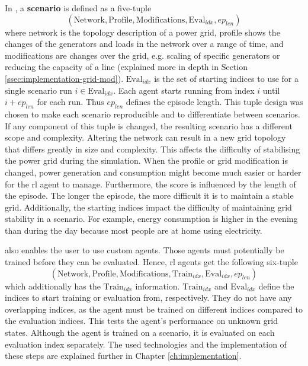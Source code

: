 In \benchmark, a \textbf{scenario} is defined as a five-tuple 
\[(\text{Network}, \text{Profile}, \text{Modifications}, \text{Eval}_{idx}, ep_{len})\]
where network is the topology description of a power grid, profile shows the changes of the generators and loads in the network over a range of time, and modifications are changes over the grid, e.g. scaling of specific generators or reducing the capacity of a line (explained more in depth in Section \ref{ssec:implementation-grid-mod}). $\text{Eval}_{idx}$ is the set of starting indices to use for a single scenario run $i\in\text{Eval}_{idx}$. Each agent starts running from index $i$ until $i + ep_{len}$ for each run. Thus $ep_{len}$ defines the episode length. This tuple design was chosen to make each scenario reproducible and to differentiate between scenarios. If any component of this tuple is changed, the resulting scenario has a different scope and complexity. Altering the network can result in a new grid topology that differs greatly in size and complexity. This affects the difficulty of stabilising the power grid during the simulation. When the profile or grid modification is changed, power generation and consumption might become much easier or harder for the \ac{rl} agent to manage. Furthermore, the score is influenced by the length of the episode. The longer the episode, the more difficult it is to maintain a stable grid. Additionally, the starting indices impact the difficulty of maintaining grid stability in a scenario. For example, energy consumption is higher in the evening than during the day because most people are at home using electricity.

\benchmark also enables the user to use custom agents. Those agents must potentially be trained before they can be evaluated. Hence, \ac{rl} agents get the following six-tuple
\[(\text{Network}, \text{Profile}, \text{Modifications}, \text{Train}_{idx}, \text{Eval}_{idx}, ep_{len})\]
which additionally has the $\text{Train}_{idx}$ information. $\text{Train}_{idx}$ and $\text{Eval}_{idx}$ define the indices to start training or evaluation from, respectively. They do not have any overlapping indices, as the agent must be trained on different indices compared to the evaluation indices. This tests the agent's performance on unknown grid states. Although the agent is trained on a scenario, it is evaluated on each evaluation index separately.
The used technologies and the implementation of these steps are explained further in Chapter \ref{ch:implementation}.



